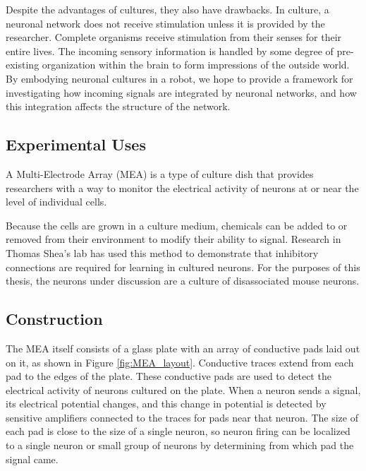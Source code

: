 \documentclass[letterpaper]{article}
\begin{document}
Despite the advantages of cultures, they also have drawbacks. 
In culture, a neuronal network does not receive stimulation unless it is provided by the researcher. 
Complete organisms receive stimulation from their senses for their entire lives. 
The incoming sensory information is handled by some degree of pre-existing organization within the brain to form impressions of the outside world. 
By embodying neuronal cultures in a robot, we hope to provide a framework for investigating how incoming signals are integrated by neuronal networks, and how this integration affects the structure of the network. 

\subsection{Experimental Uses}

A Multi-Electrode Array (MEA) is a type of culture dish that provides researchers with a way to monitor the electrical activity of neurons at or near the level of individual cells. 

Because the cells are grown in a culture medium, chemicals can be added to or removed from their environment to modify their ability to signal. 
Research in Thomas Shea's lab \cite{shea2009optimization} has used this method to demonstrate that inhibitory connections are required for learning in cultured neurons. 
For the purposes of this thesis, the neurons under discussion are a culture of disassociated mouse neurons.   

\subsection{Construction}
The MEA itself consists of a glass plate with an array of conductive pads laid out on it, as shown in Figure \ref{fig:MEA_layout}.
Conductive traces extend from each pad to the edges of the plate. 
These conductive pads are used to detect the electrical activity of neurons cultured on the plate.
When a neuron sends a signal, its electrical potential changes, and this change in potential is detected by sensitive amplifiers connected to the traces for pads near that neuron.
The size of each pad is close to the size of a single neuron, so neuron firing can be localized to a single neuron or small group of neurons by determining from which pad the signal came.
\end{document}
